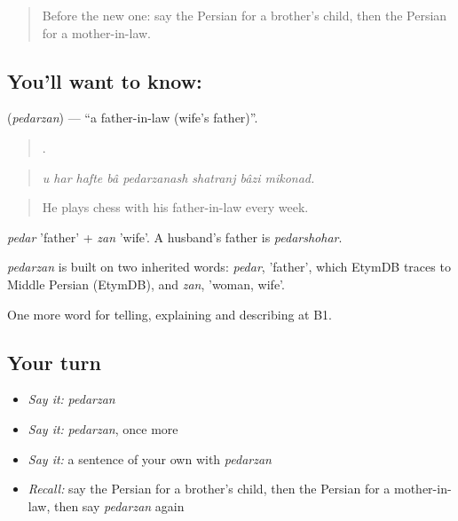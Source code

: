 \label{lesson:FA-C501-pedarzan}



\begin{quote}
Before the new one: say the Persian for a brother's child, then the Persian for a mother-in-law.
\end{quote}

\subsection*{You'll want to know: }
\textbf{} (\emph{pedarzan}) — \textquotedblleft{}a father-in-law (wife's father)\textquotedblright{}.

\begin{quote}
       .
\end{quote}

\begin{quote}
\emph{u har hafte bâ pedarzanash shatranj bâzi mikonad.}
\end{quote}

\begin{quote}
He plays chess with his father-in-law every week.
\end{quote}

\emph{pedar} 'father' + \emph{zan} 'wife'. A husband's father is \emph{pedarshohar}.

\begin{cousinweb}
\emph{pedarzan} is built on two inherited words: \emph{pedar}, 'father', which EtymDB traces to Middle Persian (EtymDB), and \emph{zan}, 'woman, wife'.
\end{cousinweb}

\begin{grammarlens}[title={What you've built}]
One more word for telling, explaining and describing at B1.
\end{grammarlens}

\subsection*{Your turn}
\begin{itemize}
\raggedright
  \item \emph{Say it:} \emph{pedarzan}
  \item \emph{Say it:} \emph{pedarzan}, once more
  \item \emph{Say it:} a sentence of your own with \emph{pedarzan}
  \item \emph{Recall:} say the Persian for a brother's child, then the Persian for a mother-in-law, then say \emph{pedarzan} again
\end{itemize}


